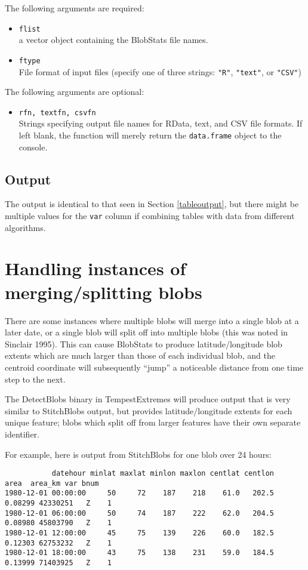 \documentclass{article}
\begin{document}
The following arguments are required:
\begin{itemize}
\item[] \texttt{flist}\\ a vector object containing the BlobStats file names.
\item[] \texttt{ftype}\\ File format of input files (specify one of three strings: \texttt{"R"}, \texttt{"text"}, or \texttt{"CSV"})
\end{itemize}

The following arguments are optional:
\begin{itemize}
\item[] \texttt{rfn, textfn, csvfn}\\Strings specifying output file names for RData, text, and CSV file formats. If left blank, the function will merely return the \texttt{data.frame} object to the console.
\end{itemize}

\subsection{Output}
The output is identical to that seen in Section \ref{tableoutput}, but there might be multiple values for the \texttt{var} column if combining tables with data from different algorithms.

\section{Handling instances of merging/splitting blobs}\label{mergesection}
There are some instances where multiple blobs will merge into a single blob at a later date, or a single blob will split off into multiple blobs (this was noted in Sinclair 1995). This can cause BlobStats to produce latitude/longitude blob extents which are much larger than those of each individual blob, and the centroid coordinate will subsequently ``jump'' a noticeable distance from one time step to the next. 

The DetectBlobs binary in TempestExtremes  will produce output that is very similar to StitchBlobs output, but provides latitude/longitude extents for each unique feature; blobs which split off from larger features have their own separate identifier.


For example, here is output from StitchBlobs for one blob over 24 hours:
\begin{verbatim}
           datehour minlat maxlat minlon maxlon centlat centlon    area  area_km var bnum
1980-12-01 00:00:00     50     72    187    218    61.0   202.5 0.08299 42330251   Z    1
1980-12-01 06:00:00     50     74    187    222    62.0   204.5 0.08980 45803790   Z    1
1980-12-01 12:00:00     45     75    139    226    60.0   182.5 0.12303 62753232   Z    1
1980-12-01 18:00:00     43     75    138    231    59.0   184.5 0.13999 71403925   Z    1
\end{verbatim}
\end{document}
